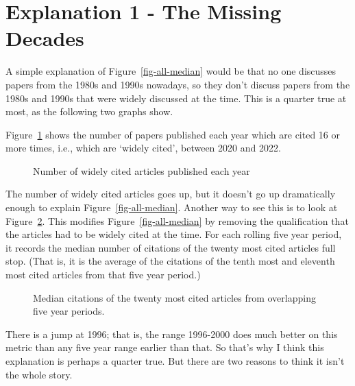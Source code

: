 \documentclass[
  10pt,
  letterpaper,
  DIV=11,
  numbers=noendperiod,
  twoside]{scrartcl}
\begin{document}
\section{Explanation 1 - The Missing Decades}\label{sec-missing-decades}

A simple explanation of Figure~\ref{fig-all-median} would be that no one
discusses papers from the 1980s and 1990s nowadays, so they don't
discuss papers from the 1980s and 1990s that were widely discussed at
the time. This is a quarter true at most, as the following two graphs
show.

Figure~\ref{fig-all-widely-cited} shows the number of papers published
each year which are cited 16 or more times, i.e., which are `widely
cited', between 2020 and 2022.

\begin{figure}


\caption{\label{fig-all-widely-cited}Number of widely cited articles
published each year}

\end{figure}%

The number of widely cited articles goes up, but it doesn't go up
dramatically enough to explain Figure~\ref{fig-all-median}. Another way
to see this is to look at Figure~\ref{fig-all-median-unqualified}. This
modifies Figure~\ref{fig-all-median} by removing the qualification that
the articles had to be widely cited at the time. For each rolling five
year period, it records the median number of citations of the twenty
most cited articles full stop. (That is, it is the average of the
citations of the tenth most and eleventh most cited articles from that
five year period.)

\begin{figure}


\caption{\label{fig-all-median-unqualified}Median citations of the
twenty most cited articles from overlapping five year periods.}

\end{figure}%

There is a jump at 1996; that is, the range 1996-2000 does much better
on this metric than any five year range earlier than that. So that's why
I think this explanation is perhaps a quarter true. But there are two
reasons to think it isn't the whole story.
\end{document}
